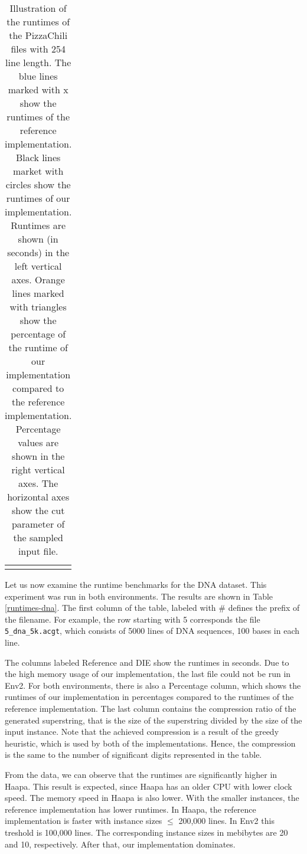 \documentclass[english,twoside,censored,csm,algorithms-track-2020]{HYthesisML}
\theoremstyle{plain}
\theoremstyle{definition}
\begin{document}
\begin{table}[]
{\begin{tabular}{c@{\hskip 0.5in}c}
\hspace{0.6cm}
\begin{minipage}{.5\textwidth}
  \caption{Illustration of the runtimes of the PizzaChili files with 254 line length. The blue lines
    marked with x show the runtimes of the reference implementation. Black lines market with circles
    show the runtimes of our implementation. Runtimes are shown (in seconds) in the left vertical
    axes. Orange lines marked with triangles show the percentage of the runtime of our implementation
    compared to the reference implementation. Percentage values are shown in the right vertical axes.
    The horizontal axes show the cut parameter of the sampled input file.}
  \label{tbl-graphs}    
\end{minipage}

  \end{tabular}%
}
\end{table}



\vspace{-2.5cm}
Let us now examine the runtime benchmarks for the DNA dataset. This experiment was run in both
environments. The results are shown in Table \ref{runtimes-dna}. The first column of the table,
labeled with \# defines the prefix of the filename. For example, the row starting with 5 corresponds the
file \texttt{5\_dna\_5k.acgt}, which consists of 5000 lines of DNA sequences, 100 bases in each
line.
  
The columns labeled Reference and DIE show the runtimes in seconds.
Due to the high memory usage of our implementation, the last file could not be run in Env2.
For both environments, there is
also a Percentage column, which shows the runtimes of our implementation in percentages compared
to the runtimes of the reference implementation. The last column contains the compression ratio of the
generated superstring, that is the size of the superstring divided by the size of the input instance.
Note that the achieved compression is a result of the greedy heuristic, which is used by both
of the implementations. Hence, the compression is the same to the number of significant digits
represented in the table.

From the data, we can observe that the runtimes are significantly higher in Haapa. This result is
expected, since Haapa has an older CPU with lower clock speed. The memory speed in Haapa is
also lower. With the smaller instances, the reference implementation has lower runtimes.
In Haapa, the reference implementation is faster with instance sizes $\leq$ 200,000 lines.
In Env2 this treshold is 100,000 lines. The corresponding instance sizes in mebibytes are
20 and 10, respectively. After that, our implementation dominates.
\end{document}
